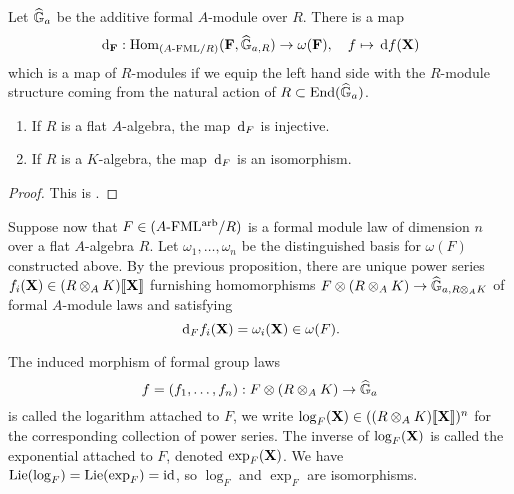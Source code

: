 Let $\widehat{\mathbb{G}}_a$ be the additive formal $A$-module over $R$. There is a map
\begin{equation} \label{eq:functorinvdifftohom}
  \, \mathrm{d}_{\mathbf{F}} : \operatorname{Hom}_{{({A}\text-\mathrm{FML}/{R})}} (\mathbf{F}, \widehat{\mathbb{G}}_{a,R}) \to \omega(\mathbf{F}), \quad f \mapsto \, \mathrm{d} f(\mathbf{X})
\end{equation}
which is a map of $R$-modules if we equip the left hand side with the $R$-module
structure coming from the natural action of $R \subset \operatorname{End}(\widehat{\mathbb{G}}_a)$. 
\begin{prop}\label{prop:loginvdiff}
  \begin{enumerate}
    \item If $R$ is a flat $A$-algebra, the map $\, \mathrm{d}_F$ is injective.
    \item If $R$ is a $K$-algebra, the map $\, \mathrm{d}_F$ is an isomorphism.
  \end{enumerate}
\begin{proof}
  This is \cite[Proposition 3.2]{hopkins1994equivariant}.
\end{proof}
\end{prop}

Suppose now that $F \in {({A}\text-\mathrm{FML^{arb}}/{R})}$ is a formal module law of dimension $n$
over a flat $A$-algebra $R$. 
Let $\omega_1, \dots, \omega_n$ be the distinguished basis for $\omega(F)$
constructed above. 
By the previous proposition, there are unique power series 
$f_i(\mathbf{X}) \in (R \otimes_A K)\llbracket \mathbf{X} \rrbracket$ furnishing homomorphisms
$F \otimes (R \otimes_A K) \to \widehat{\mathbb{G}}_{a,R\otimes_AK}$ of formal $A$-module laws
and satisfying
\begin{equation*}
  \, \mathrm{d}_F f_i(\mathbf{X}) = \omega_i(\mathbf{X}) \in \omega(F).
\end{equation*}
\begin{defi}
  The induced morphism of formal group laws
  \begin{equation*}
    f = (f_1, \dots, f_n) : F \otimes (R \otimes_A K) \to \widehat{\mathbb{G}}_a
  \end{equation*}
  is called the logarithm attached to $F$, we write 
  $\log_F(\mathbf{X}) \in ((R \otimes_A K)\llbracket \mathbf{X} \rrbracket)^n$ for the corresponding collection
  of power series. The inverse of $\log_F(\mathbf{X})$ is called the exponential 
  attached to $F$, denoted $\exp_F(\mathbf{X})$. We have $\operatorname{Lie}(\log_F) = \operatorname{Lie}(\exp_F) = \operatorname{id}$,
  so $\log_F$ and $\exp_F$ are isomorphisms.
\end{defi}

